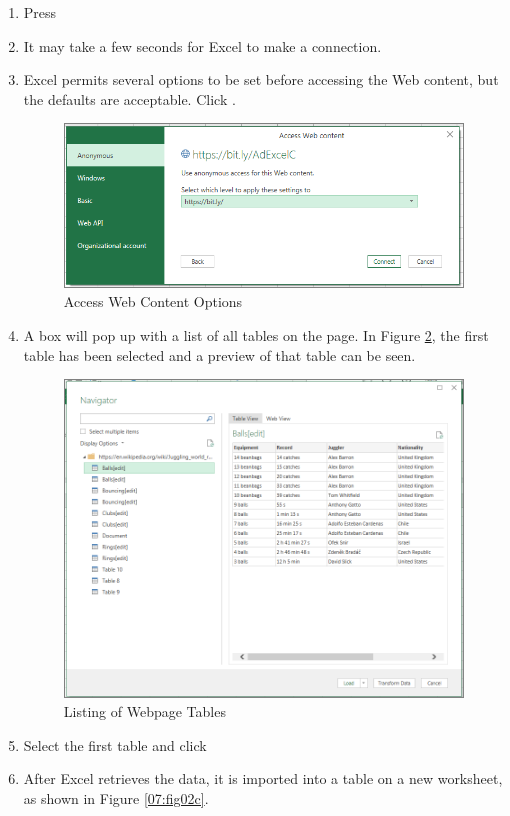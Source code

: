 \begin{enumbox}
\begin{enumerate}
		\item Press 
		\item It may take a few seconds for Excel to make a connection.
		\item Excel permits several options to be set before accessing the Web content, but the defaults are acceptable. Click .

		\begin{figure}[H]
			\centering
			\includegraphics[width=\maxwidth{.95\linewidth}]{gfx/ch07_fig02g}
			\caption{Access Web Content Options}
			\label{07:fig02g}
		\end{figure}
	
		\item A box will pop up with a list of all tables on the page. In Figure \ref{07:fig02b}, the first table has been selected and a preview of that table can be seen.

		\begin{figure}[H]
			\centering
			\includegraphics[width=\maxwidth{.95\linewidth}]{gfx/ch07_fig02b}
			\caption{Listing of Webpage Tables}
			\label{07:fig02b}
		\end{figure}

		\item Select the first table and click 
		\item After Excel retrieves the data, it is imported into a table on a new worksheet, as shown in Figure \ref{07:fig02c}.
	\end{enumerate}
\end{enumbox}

